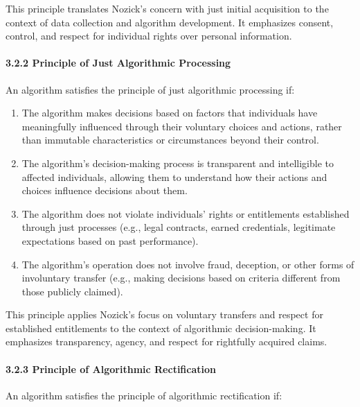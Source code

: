 This principle translates Nozick's concern with just initial acquisition
to the context of data collection and algorithm development. It
emphasizes consent, control, and respect for individual rights over
personal information.

\paragraph{3.2.2 Principle of Just Algorithmic
Processing}\label{principle-of-just-algorithmic-processing}

An algorithm satisfies the principle of just algorithmic processing if:

\begin{enumerate}
\def\labelenumi{\arabic{enumi}.}
\tightlist
\item
  The algorithm makes decisions based on factors that individuals have
  meaningfully influenced through their voluntary choices and actions,
  rather than immutable characteristics or circumstances beyond their
  control.
\item
  The algorithm's decision-making process is transparent and
  intelligible to affected individuals, allowing them to understand how
  their actions and choices influence decisions about them.
\item
  The algorithm does not violate individuals' rights or entitlements
  established through just processes (e.g., legal contracts, earned
  credentials, legitimate expectations based on past performance).
\item
  The algorithm's operation does not involve fraud, deception, or other
  forms of involuntary transfer (e.g., making decisions based on
  criteria different from those publicly claimed).
\end{enumerate}

This principle applies Nozick's focus on voluntary transfers and respect
for established entitlements to the context of algorithmic
decision-making. It emphasizes transparency, agency, and respect for
rightfully acquired claims.

\paragraph{3.2.3 Principle of Algorithmic
Rectification}\label{principle-of-algorithmic-rectification}

An algorithm satisfies the principle of algorithmic rectification if:


